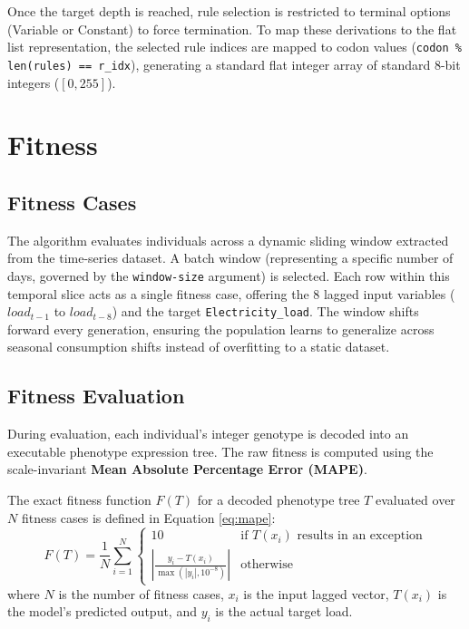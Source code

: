 \documentclass[12pt]{article}
\begin{document}
    Once the target depth is reached, rule selection is restricted to terminal options (Variable or Constant) to force termination. To map these derivations to the flat list representation, the selected rule indices are mapped to codon values (\texttt{codon \% len(rules) == r\_idx}), generating a standard flat integer array of standard 8-bit integers ($[0, 255]$).

\section{Fitness}
    \subsection{Fitness Cases}
    The algorithm evaluates individuals across a dynamic sliding window extracted from the time-series dataset. A batch window (representing a specific number of days, governed by the \texttt{window-size} argument) is selected. Each row within this temporal slice acts as a single fitness case, offering the 8 lagged input variables ($load_{t-1}$ to $load_{t-8}$) and the target \verb|Electricity_load|. The window shifts forward every generation, ensuring the population learns to generalize across seasonal consumption shifts instead of overfitting to a static dataset.
    
    \subsection{Fitness Evaluation}
    During evaluation, each individual's integer genotype is decoded into an executable phenotype expression tree. The raw fitness is computed using the scale-invariant \textbf{Mean Absolute Percentage Error (MAPE)}.
    
    The exact fitness function $F(T)$ for a decoded phenotype tree $T$ evaluated over $N$ fitness cases is defined in Equation \ref{eq:mape}:
    \begin{equation}
        F(T) = \frac{1}{N} \sum_{i=1}^{N}
        \begin{cases} 
          10 & \text{if } T(x_i) \text{ results in an exception} \\
          \left| \frac{y_i - T(x_i)}{\max(|y_i|, 10^{-8})} \right| & \text{otherwise}
       \end{cases}
       \label{eq:mape}
     \end{equation}
    where $N$ is the number of fitness cases, $x_i$ is the input lagged vector, $T(x_i)$ is the model's predicted output, and $y_i$ is the actual target load.
\end{document}
